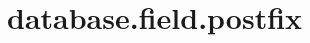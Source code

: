 \section{database.field.postfix}
\label{configuration:DatabaseFieldPostfix}
\AvailableInJavaOnly{\TODO}